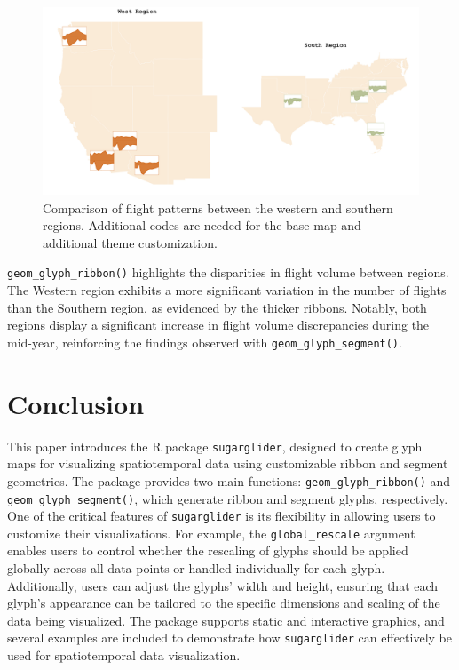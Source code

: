\begin{figure}

{\centering \includegraphics[width=1\linewidth]{figures/west_south} 

}

\caption{Comparison of flight patterns between the western and southern regions. Additional codes are needed for the base map and additional theme customization.}\label{fig:unnamed-chunk-25}
\end{figure}

\texttt{geom\_glyph\_ribbon()} highlights the disparities in flight volume between regions. The Western region exhibits a more significant variation in the number of flights than the Southern region, as evidenced by the thicker ribbons. Notably, both regions display a significant increase in flight volume discrepancies during the mid-year, reinforcing the findings observed with \texttt{geom\_glyph\_segment()}.

\hypertarget{conclusion}{%
\section{Conclusion}\label{conclusion}}

This paper introduces the R package \texttt{sugarglider}, designed to create glyph maps for visualizing spatiotemporal data using customizable ribbon and segment geometries. The package provides two main functions: \texttt{geom\_glyph\_ribbon()} and \texttt{geom\_glyph\_segment()}, which generate ribbon and segment glyphs, respectively. One of the critical features of \texttt{sugarglider} is its flexibility in allowing users to customize their visualizations. For example, the \texttt{global\_rescale} argument enables users to control whether the rescaling of glyphs should be applied globally across all data points or handled individually for each glyph. Additionally, users can adjust the glyphs' width and height, ensuring that each glyph's appearance can be tailored to the specific dimensions and scaling of the data being visualized. The package supports static and interactive graphics, and several examples are included to demonstrate how \texttt{sugarglider} can effectively be used for spatiotemporal data visualization.

